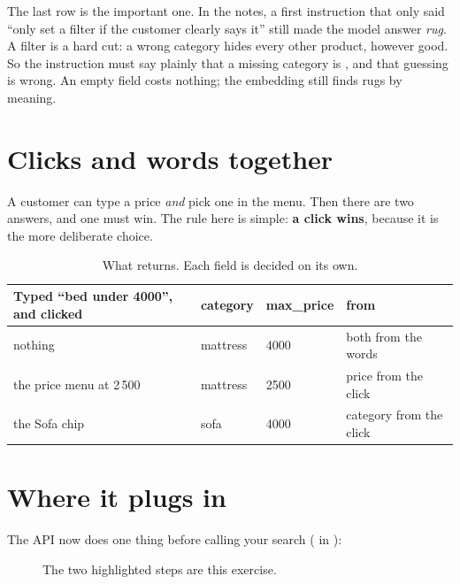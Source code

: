 \documentclass[11pt]{article}
\begin{document}
The last row is the important one. In the notes, a first instruction
that only said ``only set a filter if the customer clearly says it''
still made the model answer \emph{rug}. A filter is a hard cut: a
wrong category hides every other product, however good. So the
instruction must say plainly that a missing category is ,
and that guessing is wrong. An empty field costs nothing; the
embedding still finds rugs by meaning.

\section{Clicks and words together}

A customer can type a price \emph{and} pick one in the menu. Then there
are two answers, and one must win. The rule here is simple: \textbf{a
click wins}, because it is the more deliberate choice.

\begin{table}[H]
\small
\begin{tabularx}{\textwidth}{@{}X l l l@{}}
\toprule
Typed ``bed under 4000'', and clicked & category & max\_price & from \\
\midrule
nothing & mattress & 4000 & both from the words \\
the price menu at 2\,500 & mattress & 2500 & price from the click \\
the Sofa chip & sofa & 4000 & category from the click \\
\bottomrule
\end{tabularx}
\caption{What  returns. Each field is decided on
its own.}
\end{table}

\section{Where it plugs in}

The API now does one thing before calling your search
( in ):

\begin{figure}[H]
\centering
{}
\caption{The two highlighted steps are this exercise.}
\end{figure}
\end{document}

